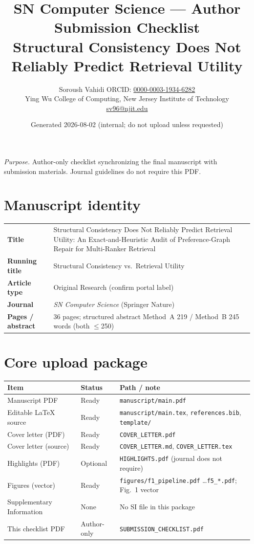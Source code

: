 \documentclass[10pt]{article}
\title{\bfseries SN Computer Science --- Author Submission Checklist\\[0.35em]
\large Structural Consistency Does Not Reliably Predict Retrieval Utility}
\author{Soroush Vahidi \quad ORCID: \href{https://orcid.org/0000-0003-1934-6282}{0000-0003-1934-6282}\\
\small Ying Wu College of Computing, New Jersey Institute of Technology\\
\small \href{mailto:sv96@njit.edu}{sv96@njit.edu}}
\date{Generated 2026-08-02 \quad (internal; do not upload unless requested)}
\begin{document}
\maketitle
\noindent\textit{Purpose.} Author-only checklist synchronizing the final manuscript
with submission materials. Journal guidelines do not require this PDF.

\section*{Manuscript identity}
\begin{tabular}{@{}L{3.2cm}L{12cm}@{}}
\textbf{Title} & Structural Consistency Does Not Reliably Predict Retrieval Utility: An Exact-and-Heuristic Audit of Preference-Graph Repair for Multi-Ranker Retrieval \\
\textbf{Running title} & Structural Consistency vs.\ Retrieval Utility \\
\textbf{Article type} & Original Research (confirm portal label) \\
\textbf{Journal} & \textit{SN Computer Science} (Springer Nature) \\
\textbf{Pages / abstract} & 36 pages; structured abstract Method~A 219 / Method~B 245 words (both $\le$250) \\
\end{tabular}

\section*{Core upload package}
\begin{longtable}{@{}L{4.2cm}C{1.6cm}L{8.5cm}@{}}
\toprule
\textbf{Item} & \textbf{Status} & \textbf{Path / note} \\
\midrule
\endhead
Manuscript PDF & Ready & \texttt{manuscript/main.pdf} \\
Editable LaTeX source & Ready & \texttt{manuscript/main.tex}, \texttt{references.bib}, \texttt{template/} \\
Cover letter (PDF) & Ready & \texttt{COVER\_LETTER.pdf} \\
Cover letter (source) & Ready & \texttt{COVER\_LETTER.md}, \texttt{COVER\_LETTER.tex} \\
Highlights (PDF) & Optional & \texttt{HIGHLIGHTS.pdf} (journal does not require) \\
Figures (vector) & Ready & \texttt{figures/f1\_pipeline.pdf} \ldots \texttt{f5\_*.pdf}; Fig.~1 vector \\
Supplementary Information & None & No SI file in this package \\
This checklist PDF & Author-only & \texttt{SUBMISSION\_CHECKLIST.pdf} \\
\bottomrule
\end{longtable}
\end{document}
